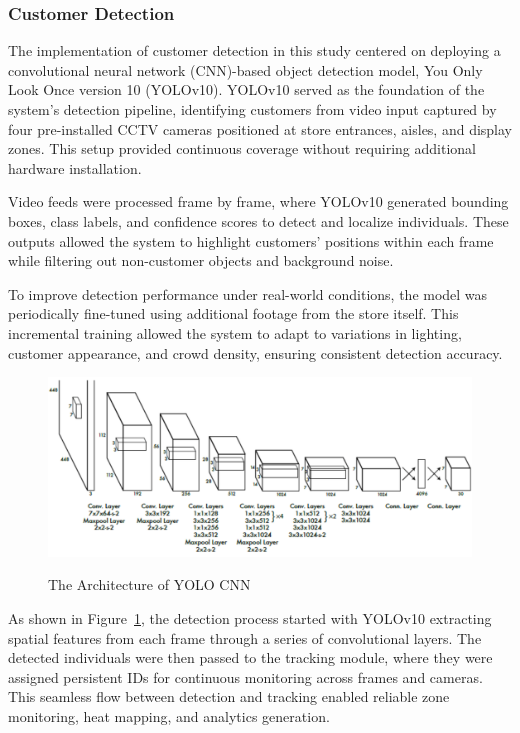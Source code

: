 {\subsubsection{Customer Detection}

The implementation of customer detection in this study centered on deploying a convolutional neural network (CNN)-based object detection model, You Only Look Once version 10 (YOLOv10). YOLOv10 served as the foundation of the system’s detection pipeline, identifying customers from video input captured by four pre-installed CCTV cameras positioned at store entrances, aisles, and display zones. This setup provided continuous coverage without requiring additional hardware installation.

Video feeds were processed frame by frame, where YOLOv10 generated bounding boxes, class labels, and confidence scores to detect and localize individuals. These outputs allowed the system to highlight customers’ positions within each frame while filtering out non-customer objects and background noise.

To improve detection performance under real-world conditions, the model was periodically fine-tuned using additional footage from the store itself. This incremental training allowed the system to adapt to variations in lighting, customer appearance, and crowd density, ensuring consistent detection accuracy.

\begin{figure}[H]
	\caption[The Architecture of YOLO CNN \citep{Artamonov2018}]{\newline \newline The Architecture of YOLO CNN \citep{Artamonov2018}}
	\centering
	\includegraphics[width=1\linewidth]{fig/3.15.pdf}
	\label{fig:3.15}
\end{figure}

As shown in Figure~\ref{fig:3.15}, the detection process started with YOLOv10 extracting spatial features from each frame through a series of convolutional layers. The detected individuals were then passed to the tracking module, where they were assigned persistent IDs for continuous monitoring across frames and cameras. This seamless flow between detection and tracking enabled reliable zone monitoring, heat mapping, and analytics generation.

}
